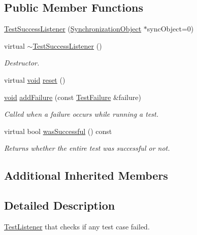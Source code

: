 \subsection*{Public Member Functions}
\begin{DoxyCompactItemize}
\item 
\hyperlink{class_test_success_listener_a88e82abf23a0563e345e0883d132f267}{Test\-Success\-Listener} (\hyperlink{class_synchronized_object_1_1_synchronization_object}{Synchronization\-Object} $\ast$sync\-Object=0)
\item 
virtual \hyperlink{class_test_success_listener_a0d51db5b1bfc10a479563244d6dcd98c}{$\sim$\-Test\-Success\-Listener} ()
\begin{DoxyCompactList}\small\item\em Destructor. \end{DoxyCompactList}\item 
virtual \hyperlink{wglew_8h_aeea6e3dfae3acf232096f57d2d57f084}{void} \hyperlink{class_test_success_listener_aa6172d9c318a9a0fdb789b7668550290}{reset} ()
\item 
\hyperlink{wglew_8h_aeea6e3dfae3acf232096f57d2d57f084}{void} \hyperlink{class_test_success_listener_a912bb5ea408b2be5b39cfb45e1bb402f}{add\-Failure} (const \hyperlink{class_test_failure}{Test\-Failure} \&failure)
\begin{DoxyCompactList}\small\item\em Called when a failure occurs while running a test. \end{DoxyCompactList}\item 
virtual bool \hyperlink{class_test_success_listener_aa33c3787a9251216c2ed4a865b4d4249}{was\-Successful} () const 
\begin{DoxyCompactList}\small\item\em Returns whether the entire test was successful or not. \end{DoxyCompactList}\end{DoxyCompactItemize}
\subsection*{Additional Inherited Members}


\subsection{Detailed Description}
\hyperlink{class_test_listener}{Test\-Listener} that checks if any test case failed. 

